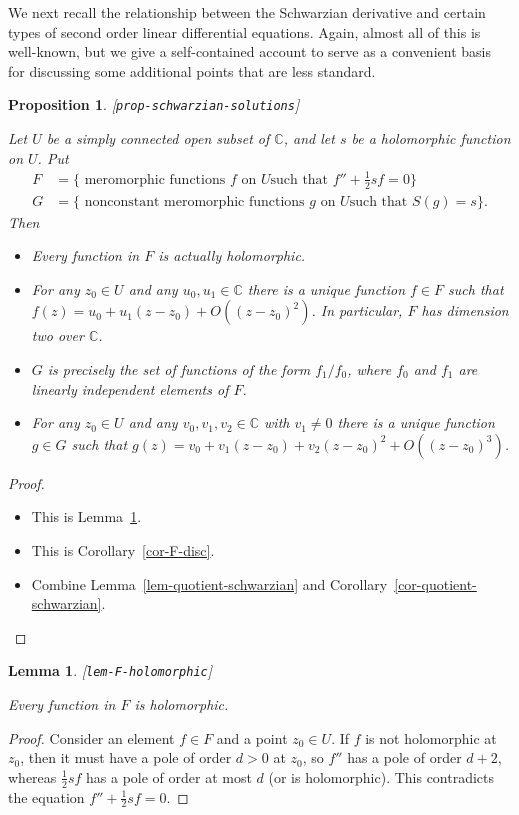 \documentclass[reqno]{amsart}
\newcommand{\lbl}[1]{\label{#1}\textup{[\texttt{#1}]}\par}
\newcommand{\lbl}{\label}
\newcommand{\C}         {{\mathbb{C}}}
\newcommand{\half}      {\tfrac{1}{2}}
\renewcommand{\:}{\colon}
\newtheorem{lemma}[theorem]{Lemma}
\newtheorem{proposition}[theorem]{Proposition}
\theoremstyle{definition}
\begin{document}
We next recall the relationship between the Schwarzian derivative and
certain types of second order linear differential equations.  Again,
almost all of this is well-known, but we give a self-contained account
to serve as a convenient basis for discussing some additional points
that are less standard.

\begin{proposition}\lbl{prop-schwarzian-solutions}
 Let $U$ be a simply connected open subset of $\C$, and let $s$ be a
 holomorphic function on $U$.  Put
 \begin{align*}
  F &= \{ \text{ meromorphic functions $f$ on $U$
                  such that $f''+\half sf=0$} \} \\
  G &= \{ \text{ nonconstant meromorphic functions $g$ on $U$
                  such that $S(g)=s$} \}.
 \end{align*}
 Then
 \begin{itemize}
  \item[(a)] Every function in $F$ is actually holomorphic.
  \item[(b)] For any $z_0\in U$ and any $u_0,u_1\in\C$ there is a
   unique function $f\in F$ such that
   $f(z)=u_0+u_1(z-z_0)+O((z-z_0)^2)$.  In particular, $F$ has
   dimension two over $\C$.
  \item[(c)] $G$ is precisely the set of functions of the form
   $f_1/f_0$, where $f_0$ and $f_1$ are linearly independent elements
   of $F$.
  \item[(d)] For any $z_0\in U$ and any $v_0,v_1,v_2\in\C$ with
   $v_1\neq 0$ there is a unique function $g\in G$ such that
   $g(z)=v_0+v_1(z-z_0)+v_2(z-z_0)^2+O((z-z_0)^3)$.
 \end{itemize}
\end{proposition}
\begin{proof}
 \begin{itemize}
  \item[(a)] This is Lemma~\ref{lem-F-holomorphic}.
  \item[(b)] This is Corollary~\ref{cor-F-disc}.
  \item[(c)] Combine Lemma~\ref{lem-quotient-schwarzian} and
   Corollary~\ref{cor-quotient-schwarzian}.
 \end{itemize}
\end{proof}

\begin{lemma}\lbl{lem-F-holomorphic}
 Every function in $F$ is holomorphic.
\end{lemma}
\begin{proof}
 Consider an element $f\in F$ and a point $z_0\in U$.  If $f$ is not
 holomorphic at $z_0$, then it must have a pole of order $d>0$ at
 $z_0$, so $f''$ has a pole of order $d+2$, whereas $\half sf$ has a
 pole of order at most $d$ (or is holomorphic).  This contradicts the
 equation $f''+\half sf=0$.
\end{proof}
\end{document}
